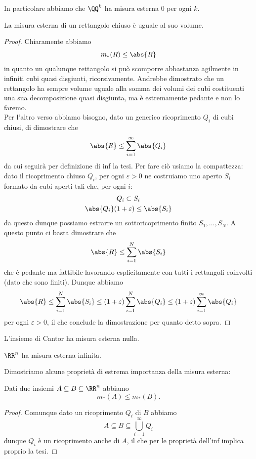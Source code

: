 \documentclass[11pt]{scrartcl}
\begin{document}
	In particolare abbiamo che $\QQ^k$ ha misura esterna $0$ per ogni $k$.
	\begin{example}[Rettangoli]
		La misura esterna di un rettangolo chiuso è uguale al suo volume.
	\end{example}
	\begin{proof}
		Chiaramente abbiamo 
		$$m_*(R)\le \abs{R}$$
		in quanto un qualunque rettangolo si può scomporre abbastanza agilmente in infiniti cubi quasi disgiunti, ricorsivamente. Andrebbe dimostrato che un rettangolo ha sempre volume uguale alla somma dei volumi dei cubi costituenti una sua decomposizione quasi disgiunta, ma è estremamente pedante e non lo faremo. \\
		Per l'altro verso abbiamo bisogno, dato un generico ricoprimento $Q_i$ di cubi chiusi, di dimostrare che
		$$\abs{R}\le \sum_{i=1}^{\infty}\abs{Q_i}$$
		da cui seguirà per definizione di inf la tesi. Per fare ciò usiamo la compattezza: dato il ricoprimento chiuso $Q_i$, per ogni $\varepsilon>0$ ne costruiamo uno aperto $S_i$ formato da cubi aperti tali che, per ogni $i$:
		\begin{gather*}
			Q_i \subset S_i \\
			\abs{Q_i}(1+\varepsilon) \le \abs{S_i}
		\end{gather*}
		da questo dunque possiamo estrarre un sottoricoprimento finito $S_1,\dots,S_N$. A questo punto ci basta dimostrare che 
		$$\abs{R}\le \sum_{i=1}^{N}\abs{S_i}$$
		che è pedante ma fattibile lavorando esplicitamente con tutti i rettangoli coinvolti (dato che sono finiti). Dunque abbiamo
		$$\abs{R}\le \sum_{i=1}^{N}\abs{S_i} \le (1+\varepsilon)\sum_{i=1}^{N}\abs{Q_i}\le (1+\varepsilon)\sum_{i=1}^{\infty}\abs{Q_i}$$
		per ogni $\varepsilon>0$, il che conclude la dimostrazione per quanto detto sopra.
	\end{proof}
	\begin{example}[Cantor]
		L'insieme di Cantor ha misura esterna nulla.
	\end{example}
	\begin{example}
		$\RR^n$ ha misura esterna infinita.
	\end{example}
	Dimostriamo alcune proprietà di estrema importanza della misura esterna:
	\begin{lemma}[Monotonia]
		Dati due insiemi $A\subseteq B \subseteq \RR^n$ abbiamo
		$$m_*(A)\le m_*(B).$$
	\end{lemma}
	\begin{proof}
		Comunque dato un ricoprimento $Q_i$ di $B$ abbiamo
		$$A\subseteq B \subseteq \bigcup_{i=1}^\infty Q_i$$
		dunque $Q_i$ è un ricoprimento anche di $A$, il che per le proprietà dell'inf implica proprio la tesi.
	\end{proof}
\end{document}
